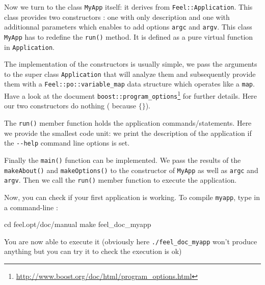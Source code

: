 Now we turn to the class \lstinline!MyApp! itself: it derives from
\lstinline!Feel::Application!. This class provides two constructors : one with only description and one with additionnal parameters which enables to add options
\lstinline!argc! and \lstinline!argv!.
This class \lstinline!MyApp! has to redefine the \lstinline!run()! method. It is defined as a pure virtual function in \lstinline!Application!.




The implementation of the constructors is usually simple, we pass the
arguments to the super class \lstinline!Application! that will analyze
them and subsequently provide them with a
\lstinline!Feel::po::variable_map! data structure which operates like
a \lstinline!map!. Have a look at the document \lstinline!boost::program_options!\footnote{\url{http://www.boost.org/doc/html/program_options.html}} for further details. Here our two constructors do nothing ( because $\{ \}$).



The \lstinline!run()! member function holds the application
commands/statements. Here we provide the smallest code unit: we print
the description of the application if the \lstinline!--help! command
line options is set.



Finally the \lstinline!main()! function can be implemented. We pass
the results of the \lstinline!makeAbout()! and
\lstinline!makeOptions()! to the constructor of \lstinline!MyApp! as
well as \lstinline!argc! and \lstinline!argv!. Then we call the
\lstinline!run()! member function to execute the application.



Now, you can check if your first \feel application is working. To compile \lstinline!myapp!, type in a command-line :
\begin{unixcom}
		cd feel.opt/doc/manual
		make feel_doc_myapp
\end{unixcom}

You are now able to execute it (obviously here \verb|./feel_doc_myapp| won't produce anything but you can try it to check the execution is ok)

